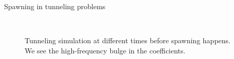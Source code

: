 \begin{chapter}{Spawning in tunneling problems}
\begin{figure}[h!]
  \centering
   \\
  \caption[Tunneling simulation at different times]{
  Tunneling simulation at different times before spawning happens. We see the
  high-frequency bulge in the coefficients.
  }
  \label{fig:spawning_propagation_intro1}
\end{figure}



\end{chapter}
